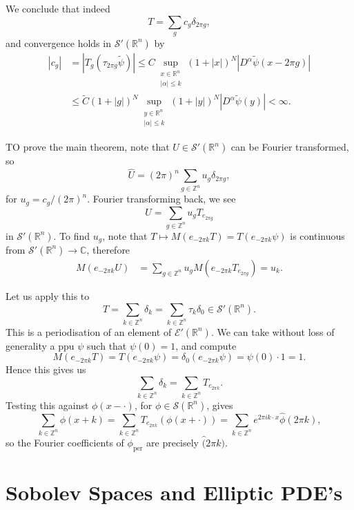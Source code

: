 \documentclass[12pt]{article}
\begin{document}
\begin{proofbox}
	We conclude that indeed
	\[
	T = \sum_g c_g \delta_{2 \pi g},
	\]
	and convergence holds in $\mathcal{S}'(\mathbb{R}^n)$ by
	\begin{align*}
		|c_g| &= |T_g(\tau_{2\pi g} \tilde \psi)| \leq C \sup_{\substack{x \in \mathbb{R}^n \\ |\alpha| \leq k}} (1 + |x|)^N |D^\alpha \tilde \psi(x - 2 \pi g)| \\
		      &\leq \tilde C(1 + |g|)^N \sup_{\substack{y \in \mathbb{R}^n \\ |\alpha| \leq k}}(1 + |y|)^N |D^\alpha \tilde \psi(y)| < \infty.
	\end{align*}

	TO prove the main theorem, note that $U \in \mathcal{S}'(\mathbb{R}^n)$ can be Fourier transformed, so
	\[
	\hat U = (2\pi)^n \sum_{g \in \mathbb{Z}^n} u_g \delta_{2\pi g},
	\]
	for $u_g = c_g/(2\pi)^n$. Fourier transforming back, we see
	\[
	U = \sum_{g \in \mathbb{Z}^n} u_g T_{e_{2\pi g}}
	\]
	in $\mathcal{S}'(\mathbb{R}^n)$. To find $u_g$, note that $T \mapsto M(e_{-2\pi k} T) = T(e_{-2\pi k} \psi)$ is continuous from $\mathcal{S}'(\mathbb{R}^n) \to \mathbb{C}$, therefore
	\begin{align*}
		M(e_{-2\pi k}U) &= \sum_{g \in \mathbb{Z}^n} u_g M(e_{-2\pi k}T_{e_{2\pi g}}) = u_k.
	\end{align*}
\end{proofbox}

Let us apply this to
\[
T = \sum_{k \in \mathbb{Z}^n} \delta_k = \sum_{k \in \mathbb{Z}^n} \tau_k \delta_0 \in \mathcal{S}'(\mathbb{R}^n).
\]
This is a periodisation of an element of $\mathcal{E}'(\mathbb{R}^n)$. We can take without loss of generality a ppu $\psi$ such that $\psi(0) = 1$, and compute
\[
M(e_{-2\pi k}T) = T(e_{-2\pi k} \psi) =\delta_0(e_{-2\pi k} \psi) = \psi(0)\cdot 1 = 1.
\]
Hence this gives us
\[
\sum_{k \in \mathbb{Z}^n} \delta_k = \sum_{k \in \mathbb{Z}^n} T_{e_{2 \pi k}}.
\]
Testing this against $\phi(x - \cdot)$, for $\phi \in \mathcal{S}(\mathbb{R}^n)$, gives
\[
\sum_{k \in \mathbb{Z}^n} \phi(x + k) = \sum_{k \in \mathbb{Z}^n} T_{e_{2 \pi k}}(\phi(x + \cdot)) = \sum_{k \in \mathbb{Z}^n} e^{2\pi i k \cdot x} \hat \phi(2 \pi k),
\]
so the Fourier coefficients of $\phi_{\mathrm{per}}$ are precisely $\hat(2 \pi k)$.


\newpage

\section{Sobolev Spaces and Elliptic PDE's}
\label{sec:ss}
\end{document}
